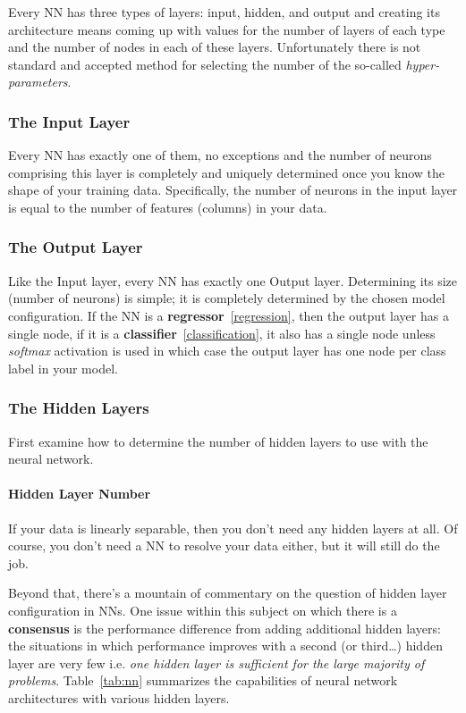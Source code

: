 Every NN has three types of layers: input, hidden, and output and creating its architecture means coming up with values for the number of layers of each type and the number of nodes in each of these layers.
Unfortunately there is not standard and accepted method for selecting the number of the so-called \emph{hyper-parameters}. 

\subsubsection*{The Input Layer}

Every NN has exactly one of them, no exceptions and the number of neurons comprising this layer is completely and uniquely determined once you know the shape of your training data. Specifically, the number of neurons in the input layer is equal to the number of features (columns) in your data. 

\subsubsection*{The Output Layer}

Like the Input layer, every NN has exactly one Output layer. Determining its size (number of neurons) is simple; it is completely determined by the chosen model configuration.
If the NN is a \textbf{regressor}~\ref{regression}, then the output layer has a single node, if it is a \textbf{classifier}~\ref{classification}, it also has a single node unless \emph{softmax} activation is used in which case the output layer has one node per class label in your model.

\subsubsection*{The Hidden Layers}

First examine how to determine the number of hidden layers to use with the neural network.

\paragraph{Hidden Layer Number}
If your data is linearly separable, then you don't need any hidden layers at all. Of course, you don't need a NN to resolve your data either, but it will still do the job.

Beyond that, there's a mountain of commentary on the question of hidden layer configuration in NNs. One issue within this subject on which there is a \textbf{consensus} is the performance difference from adding additional hidden layers: the situations in which performance improves with a second (or third\ldots) hidden layer are very few i.e. \emph{one hidden layer is sufficient for the large majority of problems}. Table~\ref{tab:nn} summarizes the capabilities of neural network architectures with various hidden layers.

